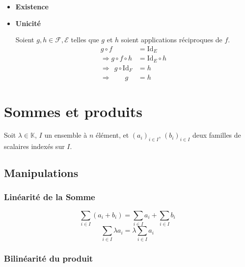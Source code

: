 \documentclass{report}
\begin{document}
          \begin{tcolorbox}[colback=white, colframe=black, boxrule=0.8pt, width=1\textwidth]
            \begin{itemize}
              \item \textbf{Existence}
              \item \textbf{Unicité}

                Soient $g,h\in\mathcal{F,E}$ telles que $g$ et $h$ soient applications réciproques de $f$.
                  \begin{align*}
                                g\circ f            &= \text{Id}_E\\
                    \Rightarrow g\circ f \circ h    &= \text{Id}_E\circ h\\
                    \Rightarrow~~g \circ\text{Id}_F &= h\\
                    \Rightarrow ~~~~~~~~~g          &= h
                  \end{align*}

            \end{itemize}
          \end{tcolorbox}   


  \newpage

  \section{Sommes et produits}

    Soit $\lambda\in\mathbb{K}$, $I$ un ensemble à $n$ élément, et $(a_i)_{i\in I}$, $(b_i)_{i\in I}$ deux familles de scalaires indexés sur $I$.

    \subsection{Manipulations}

      \subsubsection{Linéarité de la Somme}

          \[\sum_{i\in I} (a_i+b_i) = \sum_{i\in I} a_i + \sum_{i\in I} b_i\]
          \[\sum_{i\in I} \lambda a_i = \lambda\sum_{i\in I} a_i\]

      \subsubsection{Bilinéarité du produit}
\end{document}
